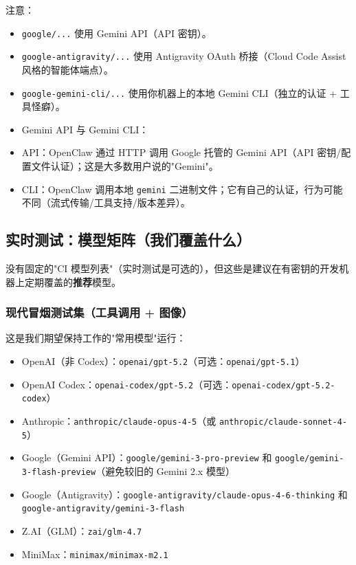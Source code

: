 注意：

\begin{itemize}
  \item \texttt{google/...} 使用 Gemini API（API 密钥）。
  \item \texttt{google-antigravity/...} 使用 Antigravity OAuth 桥接（Cloud Code Assist 风格的智能体端点）。
  \item \texttt{google-gemini-cli/...} 使用你机器上的本地 Gemini CLI（独立的认证 + 工具怪癖）。
  \item Gemini API 与 Gemini CLI：
  \item API：OpenClaw 通过 HTTP 调用 Google 托管的 Gemini API（API 密钥/配置文件认证）；这是大多数用户说的"Gemini"。
  \item CLI：OpenClaw 调用本地 \texttt{gemini} 二进制文件；它有自己的认证，行为可能不同（流式传输/工具支持/版本差异）。
\end{itemize}


\subsection{实时测试：模型矩阵（我们覆盖什么）}


没有固定的"CI 模型列表"（实时测试是可选的），但这些是建议在有密钥的开发机器上定期覆盖的\textbf{推荐}模型。

\subsubsection{现代冒烟测试集（工具调用 + 图像）}


这是我们期望保持工作的"常用模型"运行：

\begin{itemize}
  \item OpenAI（非 Codex）：\texttt{openai/gpt-5.2}（可选：\texttt{openai/gpt-5.1}）
  \item OpenAI Codex：\texttt{openai-codex/gpt-5.2}（可选：\texttt{openai-codex/gpt-5.2-codex}）
  \item Anthropic：\texttt{anthropic/claude-opus-4-5}（或 \texttt{anthropic/claude-sonnet-4-5}）
  \item Google（Gemini API）：\texttt{google/gemini-3-pro-preview} 和 \texttt{google/gemini-3-flash-preview}（避免较旧的 Gemini 2.x 模型）
  \item Google（Antigravity）：\texttt{google-antigravity/claude-opus-4-6-thinking} 和 \texttt{google-antigravity/gemini-3-flash}
  \item Z.AI（GLM）：\texttt{zai/glm-4.7}
  \item MiniMax：\texttt{minimax/minimax-m2.1}
\end{itemize}


